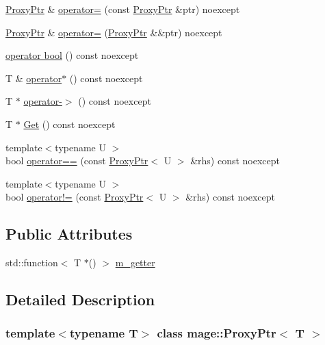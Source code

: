 \begin{DoxyCompactItemize}
\item 
\hyperlink{classmage_1_1_proxy_ptr}{Proxy\+Ptr} \& \hyperlink{classmage_1_1_proxy_ptr_a2d3a3a7595028a72a97a2c2131947a8d}{operator=} (const \hyperlink{classmage_1_1_proxy_ptr}{Proxy\+Ptr} \&ptr) noexcept
\item 
\hyperlink{classmage_1_1_proxy_ptr}{Proxy\+Ptr} \& \hyperlink{classmage_1_1_proxy_ptr_a53e38a57d8155b8cd59b3d6e332995b7}{operator=} (\hyperlink{classmage_1_1_proxy_ptr}{Proxy\+Ptr} \&\&ptr) noexcept
\item 
\hyperlink{classmage_1_1_proxy_ptr_ac1226dcf54a735bb5da12273c38e9b8f}{operator bool} () const noexcept
\item 
T \& \hyperlink{classmage_1_1_proxy_ptr_aaf7b96ea7e8350ce5f2ae1f504627fd9}{operator$\ast$} () const noexcept
\item 
T $\ast$ \hyperlink{classmage_1_1_proxy_ptr_af33f20a43615df2328d7436ff3145d54}{operator-\/$>$} () const noexcept
\item 
T $\ast$ \hyperlink{classmage_1_1_proxy_ptr_a9af6f8e3b1f1aa9d5b323ed01fb9b40d}{Get} () const noexcept
\item 
{\footnotesize template$<$typename U $>$ }\\bool \hyperlink{classmage_1_1_proxy_ptr_a786d92c5d87ac0349a60cf99642bd890}{operator==} (const \hyperlink{classmage_1_1_proxy_ptr}{Proxy\+Ptr}$<$ U $>$ \&rhs) const noexcept
\item 
{\footnotesize template$<$typename U $>$ }\\bool \hyperlink{classmage_1_1_proxy_ptr_a14c1832a1f6b48c69337931d49bf3676}{operator!=} (const \hyperlink{classmage_1_1_proxy_ptr}{Proxy\+Ptr}$<$ U $>$ \&rhs) const noexcept
\end{DoxyCompactItemize}
\subsection*{Public Attributes}
\begin{DoxyCompactItemize}
\item 
std\+::function$<$ T $\ast$() $>$ \hyperlink{classmage_1_1_proxy_ptr_a89befb78b9b20192a2966125c5b1d95d}{m\+\_\+getter}
\end{DoxyCompactItemize}


\subsection{Detailed Description}
\subsubsection*{template$<$typename T$>$\newline
class mage\+::\+Proxy\+Ptr$<$ T $>$}

